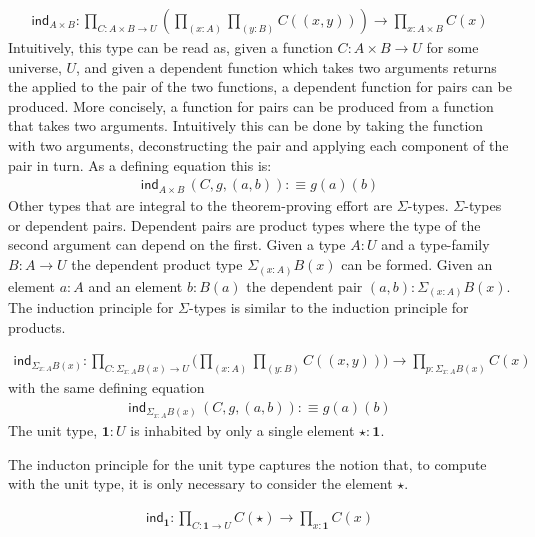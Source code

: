 \begin{align*}
    \textsf{ind}_{A \times B} : \prod_{C : A \times B\rightarrow
    U}(\prod_{(x : A)}\prod_{(y : B)}C((x , y))) \rightarrow \prod_{x : A\times
    B}C(x)
\end{align*}
Intuitively, this type can be read as, given a function $C : A \times B
\rightarrow U$ for some universe, $U$, and given a dependent function which
takes two arguments returns the  applied to the pair of the two
functions, a dependent function for pairs can be produced. More concisely, a
function for pairs can be produced from a function that takes two arguments.
Intuitively this can be done by taking the function with two arguments,
deconstructing the pair and applying each component of the pair in turn. As a
defining equation this is:
\begin{align*}
    \textsf{ind}_{A \times B}\, (C, g, (a , b)) :\equiv g(a)(b)
\end{align*}
Other types that are integral to the theorem-proving effort are $\Sigma$-types.
$\Sigma$-types or dependent pairs. Dependent pairs are product types where the
type of the second argument can depend on the first. Given a type $A : U$ and a
type-family $B : A \rightarrow U$ the dependent product type $\Sigma_{(x :
A)}B(x)$ can be formed. Given an element $a : A$ and an element $b : B(a)$ the
dependent pair $(a,b) : \Sigma_{(x : A)}B(x)$. The induction principle for
$\Sigma$-types is similar to the induction principle for products.

\begin{align*}
    \textsf{ind}_{\Sigma_{x :A}B(x)} : \prod_{C : \Sigma_{x : A }B(x)\rightarrow
    U}\bigg(\prod_{(x : A)}\prod_{(y : B)}C((x , y))\bigg) \rightarrow \prod_{p :
    \Sigma_{x : A}B(x)}C(x)
\end{align*}
with the same defining equation
\begin{align*}
    \textsf{ind}_{\Sigma_{x :A}B(x)}\, (C, g, (a , b)) :\equiv g(a)(b)
\end{align*}
The unit type, $\textbf{1} : U$ is inhabited by only a single element $\star :
\textbf{1}$.

The inducton principle for the unit type captures the notion that, to compute
with the unit type, it is only necessary to consider the element $\star$.

\begin{align*}
    \textsf{ind}_{\textbf{1}} : \prod_{C : \textbf{1} \rightarrow U}C(\star)
    \rightarrow \prod_{x : \textbf{1}}C(x)
\end{align*}

